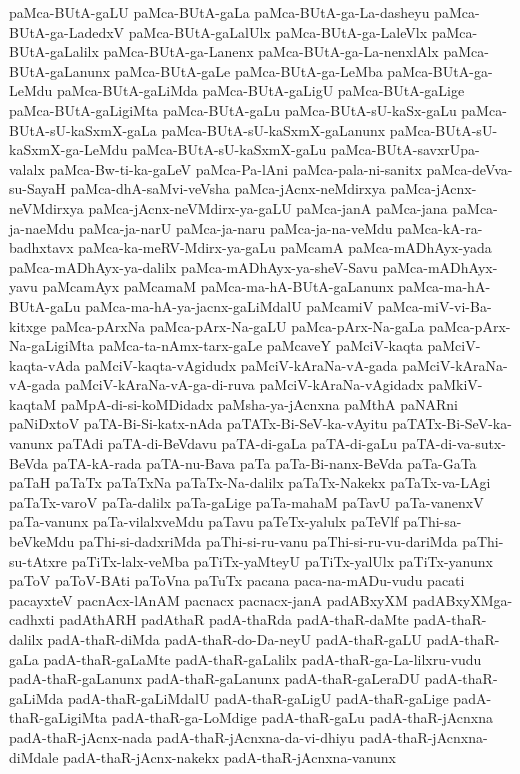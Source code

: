 {paMca-BUtA-gaLU
paMca-BUtA-gaLa
paMca-BUtA-ga-La-dasheyu
paMca-BUtA-ga-LadedxV
paMca-BUtA-gaLalUlx
paMca-BUtA-ga-LaleVlx
paMca-BUtA-gaLalilx
paMca-BUtA-ga-Lanenx
paMca-BUtA-ga-La-nenxlAlx
paMca-BUtA-gaLanunx
paMca-BUtA-gaLe
paMca-BUtA-ga-LeMba
paMca-BUtA-ga-LeMdu
paMca-BUtA-gaLiMda
paMca-BUtA-gaLigU
paMca-BUtA-gaLige
paMca-BUtA-gaLigiMta
paMca-BUtA-gaLu
paMca-BUtA-sU-kaSx-gaLu
paMca-BUtA-sU-kaSxmX-gaLa
paMca-BUtA-sU-kaSxmX-gaLanunx
paMca-BUtA-sU-kaSxmX-ga-LeMdu
paMca-BUtA-sU-kaSxmX-gaLu
paMca-BUtA-savxrUpa-valalx
paMca-Bw-ti-ka-gaLeV
paMca-Pa-lAni
paMca-pala-ni-sanitx
paMca-deVva-su-SayaH
paMca-dhA-saMvi-veVsha
paMca-jAcnx-neMdirxya
paMca-jAcnx-neVMdirxya
paMca-jAcnx-neVMdirx-ya-gaLU
paMca-janA
paMca-jana
paMca-ja-naeMdu
paMca-ja-narU
paMca-ja-naru
paMca-ja-na-veMdu
paMca-kA-ra-badhxtavx
paMca-ka-meRV-Mdirx-ya-gaLu
paMcamA
paMca-mADhAyx-yada
paMca-mADhAyx-ya-dalilx
paMca-mADhAyx-ya-sheV-Savu
paMca-mADhAyx-yavu
paMcamAyx
paMcamaM
paMca-ma-hA-BUtA-gaLanunx
paMca-ma-hA-BUtA-gaLu
paMca-ma-hA-ya-jacnx-gaLiMdalU
paMcamiV
paMca-miV-vi-Ba-kitxge
paMca-pArxNa
paMca-pArx-Na-gaLU
paMca-pArx-Na-gaLa
paMca-pArx-Na-gaLigiMta
paMca-ta-nAmx-tarx-gaLe
paMcaveY
paMciV-kaqta
paMciV-kaqta-vAda
paMciV-kaqta-vAgidudx
paMciV-kAraNa-vA-gada
paMciV-kAraNa-vA-gada
paMciV-kAraNa-vA-ga-di-ruva
paMciV-kAraNa-vAgidadx
paMkiV-kaqtaM
paMpA-di-si-koMDidadx
paMsha-ya-jAcnxna
paMthA
paNARni
paNiDxtoV
paTA-Bi-Si-katx-nAda
paTATx-Bi-SeV-ka-vAyitu
paTATx-Bi-SeV-ka-vanunx
paTAdi
paTA-di-BeVdavu
paTA-di-gaLa
paTA-di-gaLu
paTA-di-va-sutx-BeVda
paTA-kA-rada
paTA-nu-Bava
paTa
paTa-Bi-nanx-BeVda
paTa-GaTa
paTaH
paTaTx
paTaTxNa
paTaTx-Na-dalilx
paTaTx-Nakekx
paTaTx-va-LAgi
paTaTx-varoV
paTa-dalilx
paTa-gaLige
paTa-mahaM
paTavU
paTa-vanenxV
paTa-vanunx
paTa-vilalxveMdu
paTavu
paTeTx-yalulx
paTeVlf
paThi-sa-beVkeMdu
paThi-si-dadxriMda
paThi-si-ru-vanu
paThi-si-ru-vu-dariMda
paThi-su-tAtxre
paTiTx-lalx-veMba
paTiTx-yaMteyU
paTiTx-yalUlx
paTiTx-yanunx
paToV
paToV-BAti
paToVna
paTuTx
pacana
paca-na-mADu-vudu
pacati
pacayxteV
pacnAcx-lAnAM
pacnacx
pacnacx-janA
padABxyXM
padABxyXMga-cadhxti
padAthARH
padAthaR
padA-thaRda
padA-thaR-daMte
padA-thaR-dalilx
padA-thaR-diMda
padA-thaR-do-Da-neyU
padA-thaR-gaLU
padA-thaR-gaLa
padA-thaR-gaLaMte
padA-thaR-gaLalilx
padA-thaR-ga-La-lilxru-vudu
padA-thaR-gaLanunx
padA-thaR-gaLanunx
padA-thaR-gaLeraDU
padA-thaR-gaLiMda
padA-thaR-gaLiMdalU
padA-thaR-gaLigU
padA-thaR-gaLige
padA-thaR-gaLigiMta
padA-thaR-ga-LoMdige
padA-thaR-gaLu
padA-thaR-jAcnxna
padA-thaR-jAcnx-nada
padA-thaR-jAcnxna-da-vi-dhiyu
padA-thaR-jAcnxna-diMdale
padA-thaR-jAcnx-nakekx
padA-thaR-jAcnxna-vanunx
}
